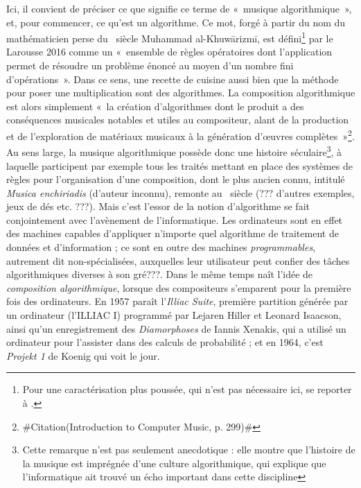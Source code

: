 \documentclass[a4paper,12pt]{article}
\newcommand{\guill}[1]{«~#1~»}
\newcommand{\zitat}[2]{\#Citation(#2)\#}
\begin{document}
Ici, il convient de préciser ce que signifie ce terme de \guill{musique algorithmique}, et, pour commencer, ce qu'est un algorithme. Ce mot, forgé à partir du nom du mathématicien perse du \IXe~siècle Muhammad al-Khuw\=arizm\=i, est défini\footnote{Pour une caractérisation plus poussée, qui n'est pas nécessaire ici, se reporter à \cite{knuth1998art}.} par le Larousse 2016 comme un \guill{ensemble de règles opératoires dont l'application permet de résoudre un problème énoncé au moyen d'un nombre fini d'opérations}. Dans ce sens, une recette de cuisine aussi bien que la méthode pour poser une multiplication sont des algorithmes. La composition algorithmique est alors simplement \guill{la création d'algorithmes dont le produit a des conséquences musicales notables et utiles au compositeur, alant de la production et de l'exploration de matériaux musicaux à la génération d'œuvres complètes}\footnote{\zitat{Formally speaking, algorithmic composition is the creation of algorithms whose output has clear musical consequences of use to the composer, from the production and exploration of musical materials to the generation of complete works.}
{Introduction to Computer Music, p. 299}}. Au sens large, la musique algorithmique possède donc une histoire séculaire\footnote{Cette remarque n'est pas seulement anecdotique : elle montre que l'histoire de la musique est imprégnée d'une culture algorithmique, qui explique que l'informatique ait trouvé un écho important dans cette discipline}, à laquelle participent par exemple tous les traités mettant en place des systèmes de règles pour l'organisation d'une composition, dont le plus ancien connu, intitulé \emph{Musica enchiriadis} (d'auteur inconnu), remonte au \IXe~siècle (??? d'autres exemples, jeux de dés etc. ???). Mais c'est l'essor de la notion d'algorithme se fait conjointement avec l'avènement de l'informatique. Les ordinateurs sont en effet des machines capables d'appliquer n'importe quel algorithme de traitement de données et d'information ; ce sont en outre des machines \emph{programmables}, autrement dit non-spécialisées, auxquelles leur utilisateur peut confier des tâches algorithmiques diverses à son gré???. Dans le même temps naît l'idée de \emph{composition algorithmique}, lorsque des compositeurs s'emparent pour la première fois des ordinateurs. En 1957 paraît l'\emph{Illiac Suite}, première partition générée par un ordinateur (l'ILLIAC I) programmé par Lejaren Hiller et Leonard Isaacson, ainsi qu'un enregistrement des \emph{Diamorphoses} de Iannis Xenakis, qui a utilisé un ordinateur pour l'assister dans des calculs de probabilité ; et en 1964, c'est \emph{Projekt 1} de Koenig qui voit le jour.
\end{document}
